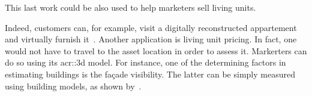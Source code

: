             This last work could be also used to help marketers sell living units.
            \addtocounter{footnote}{-1}
            \addtocounter{footnote}{1}
            Indeed, customers can, for example, visit a digitally reconstructed appartement and virtually furnish it~\parencite{kim2019planar}.
            Another application is living unit pricing.
            In fact, one would not have to travel to the asset location in order to assess it.
            Markerters can do so using its \gls{acr::3d} model.
            For instance, one of the determining factors in estimating buildings is the fa\c{c}ade visibility.
            The latter can be simply measured using building models, as shown by~\textcite{albrecht2013assessing}.

